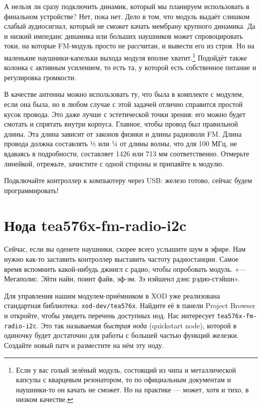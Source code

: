 А нельзя ли сразу подключить динамик, который мы планируем использовать в финальном устройстве? Нет, пока нет. Дело в том, что модуль выдаёт слишком слабый аудиосигнал, который не сможет качать мембрану крупного динамика. Да и низкий импеданс динамика или больших наушников может спровоцировать токи, на которые FM-модуль просто не рассчитан, и вывести его из строя. Но на маленькие наушники-капельки выхода модуля вполне хватит.\footnote{Если у вас голый зелёный модуль, состоящий из чипа и металлической капсулы с кварцевым резонатором, то по официальным документам и наушники-то он качать не сможет. Но на практике — может, хотя и тихо, в низком качестве.} Подойдёт также колонка с активным усилением, то есть та, у которой есть собственное питание и регулировка громкости.

В качестве антенны можно использовать ту, что была в комплекте с модулем, если она была, но в любом случае с этой задачей отлично справится простой кусок провода. Это даже лучше с эстетической точки зрения: его можно будет смотать и спрятать внутри корпуса. Главное, чтобы провод был правильной длины. Эта длина зависит от законов физики и длины радиоволн FM. Длина провода должна составлять ½ или ¼ от длины волны, что для 100 МГц, не вдаваясь в подробности, составляет 1426 или 713 мм соответственно. Отмерьте линейкой, отрежьте, зачистите с одной стороны и припаяйте к модулю.

Подключайте контроллер к компьютеру через USB: железо готово, сейчас будем программировать!

\section{Нода tea576x-fm-radio-i2c}


Сейчас, если вы оденете наушники, скорее всего услышите шум в эфире. Нам нужно как-то заставить контроллер выставить частоту радиостанции. Самое время вспомнить какой-нибудь джингл с радио, чтобы опробовать модуль.  «— Мегаполис. Эйти найн, поинт файв, эф-эм. Зэ нэйшенл дэнс рэдио-стэйшн».

Для управления нашим модулем-приёмником в XOD уже реализована стандартная библиотека: \texttt{xod-dev/tea576x}. Найдите её в панели Project Browser и откройте, чтобы увидеть перечень доступных нод. Нас интересует \texttt{tea576x-fm-radio-i2c}. Это так называемая \emph{быстрая нода} (quickstart node), которой в одиночку будет достаточно для работы с большей частью функций железки. Создайте новый патч и разместите на нём эту ноду.

